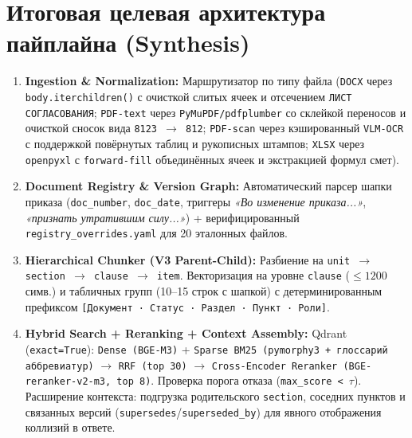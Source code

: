 \documentclass[10pt,a4paper]{article}
\begin{document}
\section{Итоговая целевая архитектура пайплайна (Synthesis)}
\begin{enumerate}
    \item \textbf{Ingestion \& Normalization:} Маршрутизатор по типу файла (\texttt{DOCX} через \texttt{body.iterchildren()} с очисткой слитых ячеек и отсечением \texttt{ЛИСТ СОГЛАСОВАНИЯ}; \texttt{PDF-text} через \texttt{PyMuPDF/pdfplumber} со склейкой переносов и очисткой сносок вида \texttt{8123 $\to$ 812}; \texttt{PDF-scan} через кэшированный \texttt{VLM-OCR} с поддержкой повёрнутых таблиц и рукописных штампов; \texttt{XLSX} через \texttt{openpyxl} с \texttt{forward-fill} объединённых ячеек и экстракцией формул смет).
    \item \textbf{Document Registry \& Version Graph:} Автоматический парсер шапки приказа (\texttt{doc\_number}, \texttt{doc\_date}, триггеры \emph{«Во изменение приказа...»}, \emph{«признать утратившим силу...»}) + верифицированный \texttt{registry\_overrides.yaml} для 20 эталонных файлов.
    \item \textbf{Hierarchical Chunker (V3 Parent-Child):} Разбиение на \texttt{unit $\to$ section $\to$ clause $\to$ item}. Векторизация на уровне \texttt{clause} ($\le 1200$ симв.) и табличных групп (10--15 строк с шапкой) с детерминированным префиксом \texttt{[Документ · Статус · Раздел · Пункт · Роли]}.
    \item \textbf{Hybrid Search + Reranking + Context Assembly:} Qdrant (\texttt{exact=True}): \texttt{Dense (BGE-M3)} + \texttt{Sparse BM25 (pymorphy3 + глоссарий аббревиатур)} $\to$ \texttt{RRF (top 30)} $\to$ \texttt{Cross-Encoder Reranker (BGE-reranker-v2-m3, top 8)}. Проверка порога отказа (\texttt{max\_score < $\tau$}). Расширение контекста: подгрузка родительского \texttt{section}, соседних пунктов и связанных версий (\texttt{supersedes}/\texttt{superseded\_by}) для явного отображения коллизий в ответе.
\end{enumerate}
\end{document}

